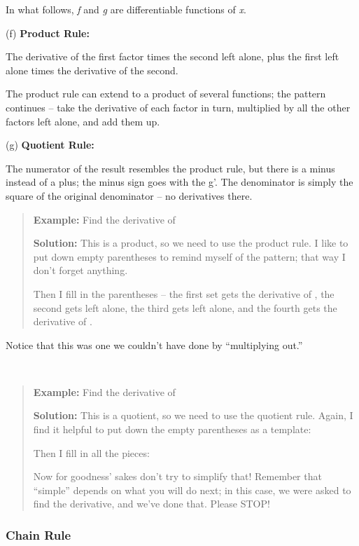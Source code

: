 In what follows, \emph{f} and \emph{g} are differentiable functions of
\emph{x}.

(f) \textbf{Product Rule:}

The derivative of the first factor times the second left alone, plus the
first left alone times the derivative of the second.

The product rule can extend to a product of several functions; the
pattern continues -- take the derivative of each factor in turn,
multiplied by all the other factors left alone, and add them up.

(g) \textbf{Quotient Rule:}

The numerator of the result resembles the product rule, but there is a
minus instead of a plus; the minus sign goes with the g'. The
denominator is simply the square of the original denominator -- no
derivatives there.

\begin{quote}
\textbf{Example:} Find the derivative of

\textbf{Solution:} This is a product, so we need to use the product
rule. I like to put down empty parentheses to remind myself of the
pattern; that way I don't forget anything.

Then I fill in the parentheses -- the first set gets the derivative of ,
the second gets left alone, the third gets left alone, and the fourth
gets the derivative of .
\end{quote}

Notice that this was one we couldn't have done by ``multiplying out.''

\textbf{\\
}

\begin{quote}
\textbf{Example:} Find the derivative of

\textbf{Solution:} This is a quotient, so we need to use the quotient
rule. Again, I find it helpful to put down the empty parentheses as a
template:

Then I fill in all the pieces:

Now for goodness' sakes don't try to simplify that! Remember that
``simple'' depends on what you will do next; in this case, we were asked
to find the derivative, and we've done that. Please STOP!
\end{quote}

\subsubsection{Chain Rule}\label{chain-rule}

